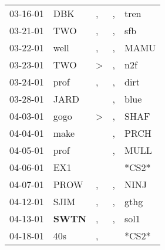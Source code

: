 \begin{supertabular}{p{0.07\textwidth}p{0.06\textwidth}p{0.02\textwidth}p{0.02\textwidth}p{0.06\textwidth}}
          03-16-01\textsuperscript{} &            DBK\textsuperscript{} &                , &                , &           tren\textsuperscript{} \\
          03-21-01\textsuperscript{} &            TWO\textsuperscript{} &                , &                , &            sfb\textsuperscript{} \\
          03-22-01\textsuperscript{} &           well\textsuperscript{} &                , &                , &           MAMU\textsuperscript{} \\
          03-23-01\textsuperscript{} &            TWO\textsuperscript{} &     \textgreater &                , &            n2f\textsuperscript{} \\
          03-24-01\textsuperscript{} &           prof\textsuperscript{} &                , &                , &           dirt\textsuperscript{} \\
          03-28-01\textsuperscript{} &           JARD\textsuperscript{} &                  &                , &           blue\textsuperscript{} \\
          04-03-01\textsuperscript{} &           gogo\textsuperscript{} &     \textgreater &                , &           SHAF\textsuperscript{} \\
          04-04-01\textsuperscript{} &           make\textsuperscript{} &                  &                , &           PRCH\textsuperscript{} \\
          04-05-01\textsuperscript{} &           prof\textsuperscript{} &                  &                , &           MULL\textsuperscript{} \\
          04-06-01\textsuperscript{} &            EX1\textsuperscript{} &                  &                  &                            *CS2* \\
          04-07-01\textsuperscript{} &           PROW\textsuperscript{} &                , &                , &           NINJ\textsuperscript{} \\
          04-12-01\textsuperscript{} &           SJIM\textsuperscript{} &                , &                , &           gthg\textsuperscript{} \\
          04-13-01\textsuperscript{} &  \textbf{SWTN\textsuperscript{}} &                , &                , &           sol1\textsuperscript{} \\
          04-18-01\textsuperscript{} &            40s\textsuperscript{} &                , &                  &                            *CS2* \\

\end{supertabular}
